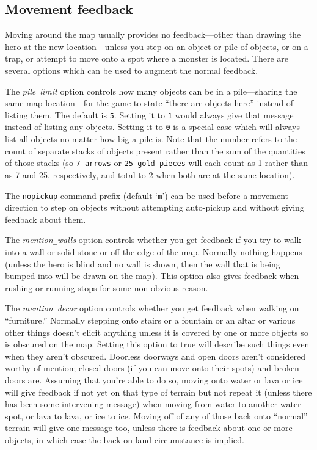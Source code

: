 \subsection*{Movement feedback}

Moving around the map usually provides no
feedback---other than drawing the hero at the new location---unless
you step on an object or pile of objects,
or on a trap, or attempt to move onto a spot where a monster is located.
There are several options which can be used to augment the normal feedback.

The
{\it pile\verb+_+limit\/}
option controls how many objects can be in a
pile---sharing the same map location---for
the game to state ``there are objects here'' instead of listing them.
The default is {\tt 5}.
Setting it to {\tt 1} would always give that message instead of listing
any objects.
Setting it to {\tt 0} is a special case which will always list all
objects no matter how big a pile is.
Note that the number refers to the count of separate stacks of objects
present rather than the sum of the quantities of those stacks (so
{\tt 7 arrows} or {\tt 25 gold pieces} will each count as 1 rather
than as 7 and 25, respectively, and total to 2 when both are at the
same location).

The {\tt nopickup} command prefix (default `{\tt m}') can be
used before a movement direction to step on objects without attempting
auto-pickup and without giving feedback about them.

The
{\it mention\verb+_+walls\/}
option controls whether you get feedback if you try to walk into a wall
or solid stone or off the edge of the map.
Normally nothing happens (unless the hero is blind and no wall is shown,
then the wall that is being bumped into will be drawn on the map).
This option also gives feedback when rushing or running stops for
some non-obvious reason.

The
{\it mention\verb+_+decor\/}
option controls whether you get feedback when walking on ``furniture.''
Normally stepping onto stairs or a fountain or an altar or various other
things doesn't elicit anything unless it is covered by one or more objects
so is obscured on the map.
Setting this option to true will describe such things even when they
aren't obscured.
Doorless doorways and open doors aren't considered worthy of mention;
closed doors (if you can move onto their spots) and broken doors are.
Assuming that you're able to do so, moving onto water or lava or ice
will give feedback if not yet on that type of terrain but not repeat it
(unless there has been some intervening message) when moving from water
to another water spot, or lava to lava, or ice to ice.
Moving off of any of those back onto ``normal'' terrain will give one
message too, unless there is feedback about one or more objects, in which
case the back on land circumstance is implied.

